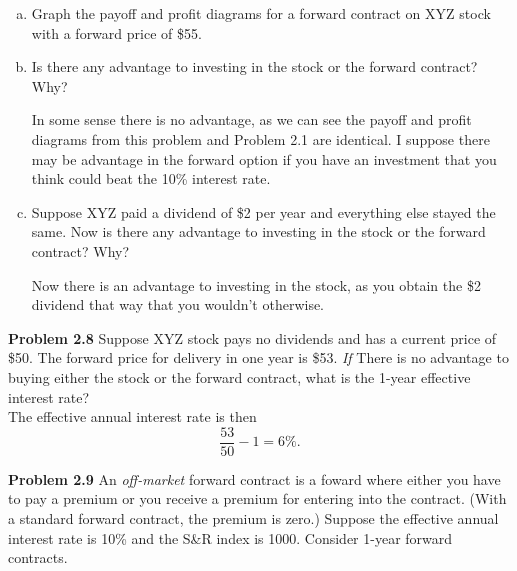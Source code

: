 \documentclass[12pt]{article}
\newcommand{\problem}[1]{\bigskip \noindent \textbf{Problem #1}}
\theoremstyle{plain}
\begin{document}
\begin{enumerate}[(a)]
\item Graph the payoff and profit diagrams for a forward contract on XYZ stock with a forward price of \$55.

\begin{center}
\end{center}

\item Is there any advantage to investing in the stock or the forward contract? Why?

In some sense there is no advantage, as we can see the payoff and profit diagrams from this problem and {Problem 2.1} are identical. I suppose there may be advantage in the forward option if you have an investment that you think could beat the 10\% interest rate.

\item Suppose XYZ paid a dividend of \$2 per year and everything else stayed the same. Now is there any advantage to investing in the stock or the forward contract? Why?

Now there is an advantage to investing in the stock, as you obtain the \$2 dividend that way that you wouldn't otherwise.

\end{enumerate}

\problem{2.8} Suppose XYZ stock pays no dividends and has a current price of \$50. The forward price for delivery in one year is \$53. \emph{If} There is no advantage to buying either the stock or the forward contract, what is the 1-year effective interest rate?\\

The effective annual interest rate is then
\[
\frac{53}{50} - 1 = 6\%.
\]

\problem{2.9} An \emph{off-market} forward contract is a foward where either you have to pay a premium or you receive a premium for entering into the contract. (With a standard forward contract, the premium is zero.) Suppose the effective annual interest rate is 10\% and the S\&R index is 1000. Consider 1-year forward contracts.
\end{document}
